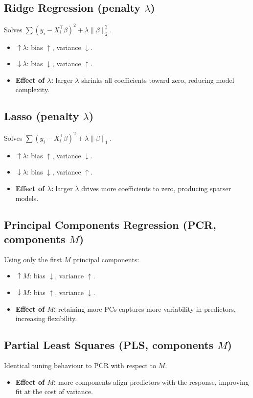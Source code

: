 \documentclass{article}
\begin{document}
\subsection{Ridge Regression (penalty \(\lambda\))}
Solves \(\sum(y_i - X_i^\top\beta)^2 + \lambda\|\beta\|_2^2\).
\begin{itemize}
  \item \(\uparrow\lambda\): bias \(\uparrow\), variance \(\downarrow\).
  \item \(\downarrow\lambda\): bias \(\downarrow\), variance \(\uparrow\).
  \item \textbf{Effect of \(\lambda\):} larger \(\lambda\) shrinks all coefficients toward zero, reducing model complexity.
\end{itemize}

\subsection{Lasso (penalty \(\lambda\))}
Solves \(\sum(y_i - X_i^\top\beta)^2 + \lambda\|\beta\|_1\).
\begin{itemize}
  \item \(\uparrow\lambda\): bias \(\uparrow\), variance \(\downarrow\).
  \item \(\downarrow\lambda\): bias \(\downarrow\), variance \(\uparrow\).
  \item \textbf{Effect of \(\lambda\):} larger \(\lambda\) drives more coefficients to zero, producing sparser models.
\end{itemize}

\subsection{Principal Components Regression (PCR, components \(M\))}
Using only the first \(M\) principal components:
\begin{itemize}
  \item \(\uparrow M\): bias \(\downarrow\), variance \(\uparrow\).
  \item \(\downarrow M\): bias \(\uparrow\), variance \(\downarrow\).
  \item \textbf{Effect of \(M\):} retaining more PCs captures more variability in predictors, increasing flexibility.
\end{itemize}

\subsection{Partial Least Squares (PLS, components \(M\))}
Identical tuning behaviour to PCR with respect to \(M\).
\begin{itemize}
  \item \textbf{Effect of \(M\):} more components align predictors with the response, improving fit at the cost of variance.
\end{itemize}
\end{document}

